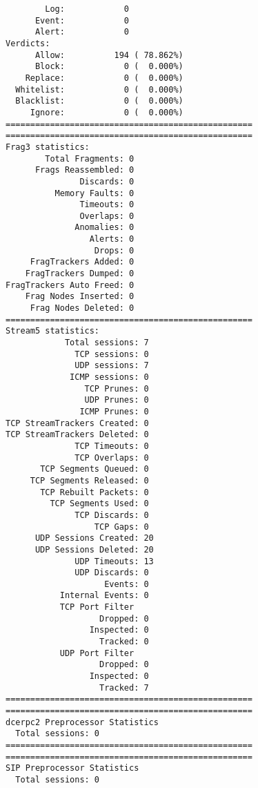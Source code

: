 \documentclass[titlepage]{article}
\begin{document}
\begin{lstlisting}
        Log:            0
      Event:            0
      Alert:            0
Verdicts:
      Allow:          194 ( 78.862%)
      Block:            0 (  0.000%)
    Replace:            0 (  0.000%)
  Whitelist:            0 (  0.000%)
  Blacklist:            0 (  0.000%)
     Ignore:            0 (  0.000%)
==================================================
==================================================
Frag3 statistics:
        Total Fragments: 0
      Frags Reassembled: 0
               Discards: 0
          Memory Faults: 0
               Timeouts: 0
               Overlaps: 0
              Anomalies: 0
                 Alerts: 0
                  Drops: 0
     FragTrackers Added: 0
    FragTrackers Dumped: 0
FragTrackers Auto Freed: 0
    Frag Nodes Inserted: 0
     Frag Nodes Deleted: 0
==================================================
Stream5 statistics:
            Total sessions: 7
              TCP sessions: 0
              UDP sessions: 7
             ICMP sessions: 0
                TCP Prunes: 0
                UDP Prunes: 0
               ICMP Prunes: 0
TCP StreamTrackers Created: 0
TCP StreamTrackers Deleted: 0
              TCP Timeouts: 0
              TCP Overlaps: 0
       TCP Segments Queued: 0
     TCP Segments Released: 0
       TCP Rebuilt Packets: 0
         TCP Segments Used: 0
              TCP Discards: 0
                  TCP Gaps: 0
      UDP Sessions Created: 20
      UDP Sessions Deleted: 20
              UDP Timeouts: 13
              UDP Discards: 0
                    Events: 0
           Internal Events: 0
           TCP Port Filter
                   Dropped: 0
                 Inspected: 0
                   Tracked: 0
           UDP Port Filter
                   Dropped: 0
                 Inspected: 0
                   Tracked: 7
==================================================
==================================================
dcerpc2 Preprocessor Statistics
  Total sessions: 0
==================================================
==================================================
SIP Preprocessor Statistics
  Total sessions: 0
\end{lstlisting}
\end{document}
